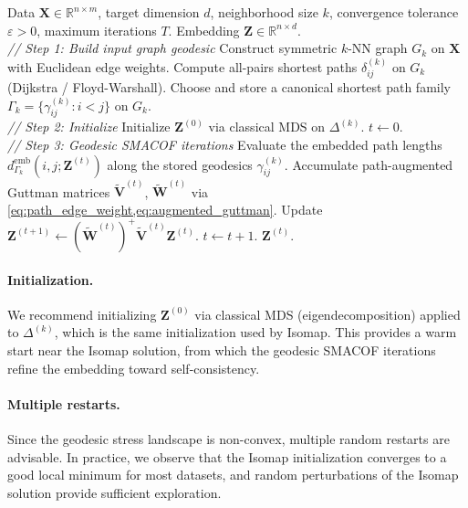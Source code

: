 \documentclass[twoside,11pt]{article}
\newcommand{\R}{\mathbb{R}}
\newcommand{\bX}{\mathbf{X}}
\newcommand{\bZ}{\mathbf{Z}}
\newcommand{\bV}{\mathbf{V}}
\newcommand{\bW}{\mathbf{W}}
\newcommand{\abs}[1]{\left|#1\right|}
\newcommand{\demb}{d^{\mathrm{emb}}}
\newcommand{\Gk}{G_k}
\begin{document}
\begin{algorithm}
\caption{Geodesic MDS}
\label{alg:geodesic_mds}
\begin{algorithmic}[1]
  \REQUIRE Data $\bX \in \R^{n \times m}$, target dimension $d$,
           neighborhood size $k$, convergence tolerance $\varepsilon > 0$,
           maximum iterations $T$.
  \ENSURE Embedding $\bZ \in \R^{n \times d}$.
  \\
  \textit{// Step 1: Build input graph geodesic}
  \STATE Construct symmetric $k$-NN graph $\Gk$ on $\bX$ with Euclidean
         edge weights.
  \STATE Compute all-pairs shortest paths $\delta^{(k)}_{ij}$ on $\Gk$
         (Dijkstra / Floyd-Warshall).
  \STATE Choose and store a canonical shortest path family
         $\Gamma_k = \{\gamma_{ij}^{(k)} : i < j\}$ on $\Gk$.
  \\
  \textit{// Step 2: Initialize}
  \STATE Initialize $\bZ^{(0)}$ via classical MDS on $\Delta^{(k)}$.
  \STATE $t \leftarrow 0$.
  \\
  \textit{// Step 3: Geodesic SMACOF iterations}
  \REPEAT
    \STATE Evaluate the embedded path lengths
           $\demb_{\Gamma_k}(i,j;\bZ^{(t)})$ along the stored geodesics
           $\gamma_{ij}^{(k)}$.
    \STATE Accumulate path-augmented Guttman matrices
           $\tilde{\bV}^{(t)}$, $\tilde{\bW}^{(t)}$ via \cref{eq:path_edge_weight,eq:augmented_guttman}.
    \STATE Update $\bZ^{(t+1)} \leftarrow (\tilde{\bW}^{(t)})^+ \tilde{\bV}^{(t)} \bZ^{(t)}$.
    \STATE $t \leftarrow t + 1$.
  \UNTIL{$\abs{\sigma^{\mathrm{geo}}(\bZ^{(t)}) - \sigma^{\mathrm{geo}}(\bZ^{(t-1)})} < \varepsilon$
         or $t \geq T$.}
  \RETURN $\bZ^{(t)}$.
\end{algorithmic}
\end{algorithm}

\paragraph{Initialization.}
We recommend initializing $\bZ^{(0)}$ via classical MDS (eigendecomposition)
applied to $\Delta^{(k)}$, which is the same initialization used by Isomap.
This provides a warm start near the Isomap solution, from which the geodesic
SMACOF iterations refine the embedding toward self-consistency.

\paragraph{Multiple restarts.}
Since the geodesic stress landscape is non-convex, multiple random
restarts are advisable.  In practice, we observe that the Isomap
initialization converges to a good local minimum for most datasets,
and random perturbations of the Isomap solution provide sufficient
exploration.
\end{document}
